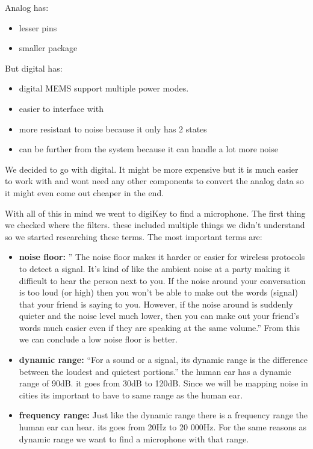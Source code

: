         \newpage
        
        Analog has:
        \begin{itemize}
            \item lesser pins
            \item smaller package
        \end{itemize}
        But digital has:
        \begin{itemize}
            \item digital MEMS support multiple power modes. 
            \item easier to interface with
            \item more resistant to noise because it only has 2 states 
            \item can be further from the system because it can handle a lot more noise
        \end{itemize}
        We decided to go with digital. It might be more expensive but it is much easier
        to work with and wont need any other components to convert the analog data so
        it might even come out cheaper in the end.
        
        With all of this in mind we went to digiKey to find a microphone. 
        The first thing we checked where the filters. these included multiple
        things we didn't understand so we started researching these terms.
        The most important terms are:
        \begin{itemize}
            \item \textbf{noise floor:} ” The noise floor makes it harder or easier for wireless protocols to detect a signal. It’s kind of like the ambient noise at a party making it difficult to hear the person next to you.
            If the noise around your conversation is too loud (or high) then you won’t be able to make out the words (signal) that your friend is saying to you. However, if the noise around is suddenly quieter and the noise level much lower, then you can make out your friend’s words much easier even if they are speaking at the same volume.”  From this we can conclude a low noise floor is better.
            \item \textbf{dynamic range:} “For a sound or a signal, its dynamic range is the difference between the loudest and quietest portions.”  the human ear has a dynamic range of 90dB. it goes from 30dB to 120dB. Since we will be mapping noise in cities its important to have to same range as the human ear.
            \item \textbf{frequency range:} Just like the dynamic range there is a frequency range the human ear can hear. its goes from 20Hz to 20 000Hz. For the same reasons as dynamic range we want to find a microphone with that range.
        \end{itemize}
        

